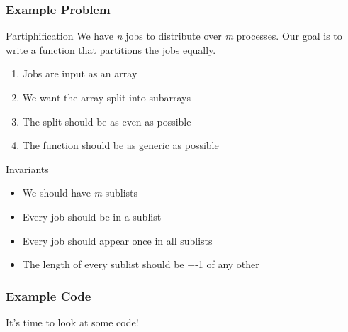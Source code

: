 \begin{frame}
  \frametitle{Example Problem}
  \begin{block}{Partiphification}
    We have \emph{n} jobs to distribute over \emph{m} processes. Our goal is to write a function that partitions the jobs equally.
    \begin{enumerate}
      \item Jobs are input as an array
      \item We want the array split into subarrays
      \item The split should be as even as possible
      \item The function should be as generic as possible
    \end{enumerate}
  \end{block}
  \begin{block}{Invariants}
    \begin{itemize}
      \item We should have \emph{m} sublists
      \item Every job should be in a sublist
      \item Every job should appear once in all sublists
      \item The length of every sublist should be +-1 of any other
    \end{itemize}
  \end{block}
\end{frame}
\begin{frame}
  \frametitle{Example Code}
  It's time to look at some code!
\end{frame}
